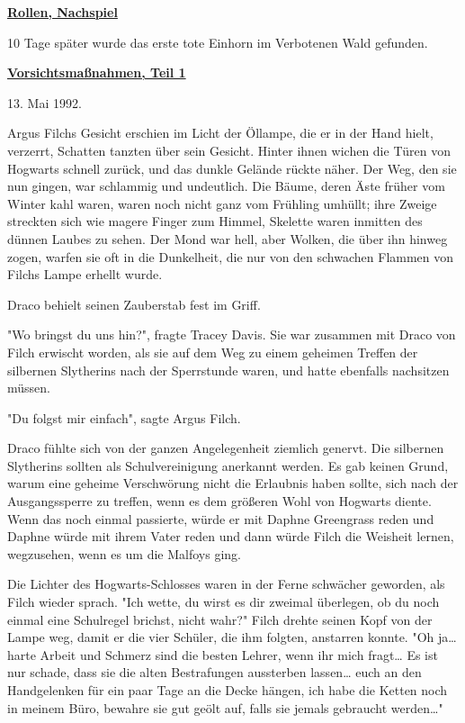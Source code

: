 

\hypertarget{rollen-nachspiel-vorsichtsmauxdfnahmen-teil-1}{%

\textbf{\uline{Rollen, Nachspiel}}

10 Tage später wurde das erste tote Einhorn im Verbotenen Wald gefunden.

\textbf{\uline{Vorsichtsmaßnahmen, Teil 1}}

13. Mai 1992.

Argus Filchs Gesicht erschien im Licht der Öllampe, die er in der Hand hielt, verzerrt, Schatten tanzten über sein Gesicht. Hinter ihnen wichen die Türen von Hogwarts schnell zurück, und das dunkle Gelände rückte näher. Der Weg, den sie nun gingen, war schlammig und undeutlich. Die Bäume, deren Äste früher vom Winter kahl waren, waren noch nicht ganz vom Frühling umhüllt; ihre Zweige streckten sich wie magere Finger zum Himmel, Skelette waren inmitten des dünnen Laubes zu sehen. Der Mond war hell, aber Wolken, die über ihn hinweg zogen, warfen sie oft in die Dunkelheit, die nur von den schwachen Flammen von Filchs Lampe erhellt wurde.

Draco behielt seinen Zauberstab fest im Griff.

"Wo bringst du uns hin?", fragte Tracey Davis. Sie war zusammen mit Draco von Filch erwischt worden, als sie auf dem Weg zu einem geheimen Treffen der silbernen Slytherins nach der Sperrstunde waren, und hatte ebenfalls nachsitzen müssen.

"Du folgst mir einfach", sagte Argus Filch.

Draco fühlte sich von der ganzen Angelegenheit ziemlich genervt. Die silbernen Slytherins sollten als Schulvereinigung anerkannt werden. Es gab keinen Grund, warum eine geheime Verschwörung nicht die Erlaubnis haben sollte, sich nach der Ausgangssperre zu treffen, wenn es dem größeren Wohl von Hogwarts diente. Wenn das noch einmal passierte, würde er mit Daphne Greengrass reden und Daphne würde mit ihrem Vater reden und dann würde Filch die Weisheit lernen, wegzusehen, wenn es um die Malfoys ging.

Die Lichter des Hogwarts-Schlosses waren in der Ferne schwächer geworden, als Filch wieder sprach. "Ich wette, du wirst es dir zweimal überlegen, ob du noch einmal eine Schulregel brichst, nicht wahr?" Filch drehte seinen Kopf von der Lampe weg, damit er die vier Schüler, die ihm folgten, anstarren konnte. "Oh ja… harte Arbeit und Schmerz sind die besten Lehrer, wenn ihr mich fragt… Es ist nur schade, dass sie die alten Bestrafungen aussterben lassen… euch an den Handgelenken für ein paar Tage an die Decke hängen, ich habe die Ketten noch in meinem Büro, bewahre sie gut geölt auf, falls sie jemals gebraucht werden…"

}
